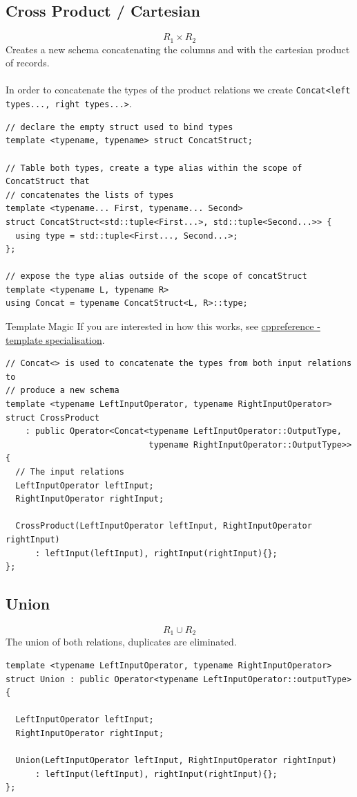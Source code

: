 \subsection{Cross Product / Cartesian}
\[R_1 \times R_2\]
Creates a new schema concatenating the columns and with the cartesian product of records.
\\
\\ In order to concatenate the types of the product relations we create \texttt{Concat<left types..., right types...>}.
\begin{verbatim}
// declare the empty struct used to bind types
template <typename, typename> struct ConcatStruct;

// Table both types, create a type alias within the scope of ConcatStruct that 
// concatenates the lists of types 
template <typename... First, typename... Second>
struct ConcatStruct<std::tuple<First...>, std::tuple<Second...>> {
  using type = std::tuple<First..., Second...>;
};

// expose the type alias outside of the scope of concatStruct 
template <typename L, typename R>
using Concat = typename ConcatStruct<L, R>::type;
\end{verbatim}
\begin{sidenotebox}{Template Magic}
  If you are interested in how this works, see \href{https://en.cppreference.com/w/cpp/language/template_specialization}{cppreference - template specialisation}.
\end{sidenotebox}

\begin{verbatim}
// Concat<> is used to concatenate the types from both input relations to 
// produce a new schema
template <typename LeftInputOperator, typename RightInputOperator>
struct CrossProduct
    : public Operator<Concat<typename LeftInputOperator::OutputType,
                             typename RightInputOperator::OutputType>> {
  // The input relations
  LeftInputOperator leftInput;
  RightInputOperator rightInput;

  CrossProduct(LeftInputOperator leftInput, RightInputOperator rightInput)
      : leftInput(leftInput), rightInput(rightInput){};
};
\end{verbatim}

\subsection{Union}
\[R_1 \cup R_2\]
The union of both relations, duplicates are eliminated.
\begin{verbatim}
template <typename LeftInputOperator, typename RightInputOperator>
struct Union : public Operator<typename LeftInputOperator::outputType> {
  
  LeftInputOperator leftInput;
  RightInputOperator rightInput;

  Union(LeftInputOperator leftInput, RightInputOperator rightInput)
      : leftInput(leftInput), rightInput(rightInput){};
};
\end{verbatim}

